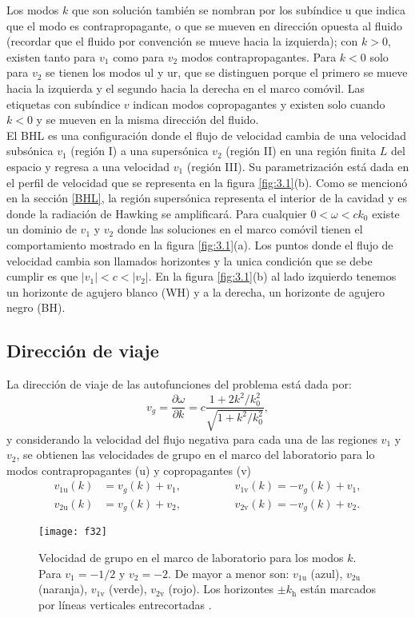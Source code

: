 Los modos $k$ que son soluci\'{o}n tambi\'{e}n se nombran por los sub\'{i}ndice u que indica que el modo es contrapropagante, o que se mueven en direcci\'{o}n opuesta al fluido (recordar que el fluido por convenci\'{o}n se mueve hacia la izquierda); con $k>0$, existen tanto para $v_1$ como para $v_2$ modos contrapropagantes. Para $k<0$ solo para $v_2$ se tienen los modos $\text{ul}$ y $\text{ur}$, que se distinguen porque el primero se mueve hacia la izquierda y el segundo hacia la derecha en el marco com\'{o}vil. Las etiquetas con sub\'{i}ndice $v$ indican modos copropagantes y existen solo cuando $k<0$ y se mueven en la misma direcci\'{o}n del fluido.\\

El BHL es una configuraci\'{o}n donde el flujo de velocidad cambia de una velocidad subs\'{o}nica $v_1$  (región I) a una supers\'{o}nica $v_2$ (región II) en una regi\'{o}n finita $L$ del espacio  y regresa a una velocidad $v_1$ (región III). Su parametrizaci\'{o}n est\'{a} dada en el perfil de velocidad que se representa en la figura \ref{fig:3.1}(b). Como se mencion\'{o} en la secci\'{o}n \ref{BHL}, la regi\'{o}n supers\'{o}nica representa el interior de la cavidad y es donde la radiaci\'{o}n de Hawking se amplificar\'{a}. Para cualquier $0<\omega<ck_0$ existe un dominio de $v_1$ y $v_2$ donde las soluciones en el marco com\'{o}vil tienen el comportamiento mostrado en la figura \ref{fig:3.1}(a). Los puntos donde el flujo de velocidad cambia son llamados horizontes y la unica condici\'{o}n que se debe cumplir es que $|v_1|<c<|v_2|$. En la figura \ref{fig:3.1}(b) al lado izquierdo tenemos un horizonte de agujero blanco (WH) y a la derecha, un horizonte de agujero negro (BH).

\subsection{Direcci\'{o}n de viaje}
La direcci\'{o}n de viaje de las autofunciones del problema est\'{a} dada por:
\begin{equation}
v_g=\frac{\partial \omega}{\partial k}=c\frac{1+2k^2/k_0^2}{\sqrt{1+k^2/k_0^2}},
\end{equation} 
y considerando la velocidad del flujo negativa para cada una de las regiones $v_1$ y $v_2$, se obtienen las velocidades de grupo en el marco del laboratorio para lo modos contrapropagantes (u) y copropagantes (v)
\begin{align}
v_{\text{1u}}(k)&=v_g(k)+v_1,\hspace{2cm} v_{\text{1v}}(k)=-v_g(k)+v_1,\\
v_{\text{2u}}(k)&=v_g(k)+v_2,\hspace{2cm} v_{\text{2v}}(k)=-v_g(k)+v_2.
\end{align}
\begin{figure}\centering
	\texttt{[image: f32]}
	\caption{Velocidad de grupo en el marco de laboratorio para los modos $k$. Para $v_1=-1/2$ y $v_2=-2.$ De mayor a menor son: $v_{\text{1u}}$ (azul), $v_{\text{2u}}$ (naranja), $v_{\text{1v}}$ (verde), $v_{\text{2v}}$ (rojo). Los horizontes $\pm k_\text{h}$ están marcados por líneas verticales entrecortadas \cite{2018Bermudez}.}\label{fig:3.2}
\end{figure}

